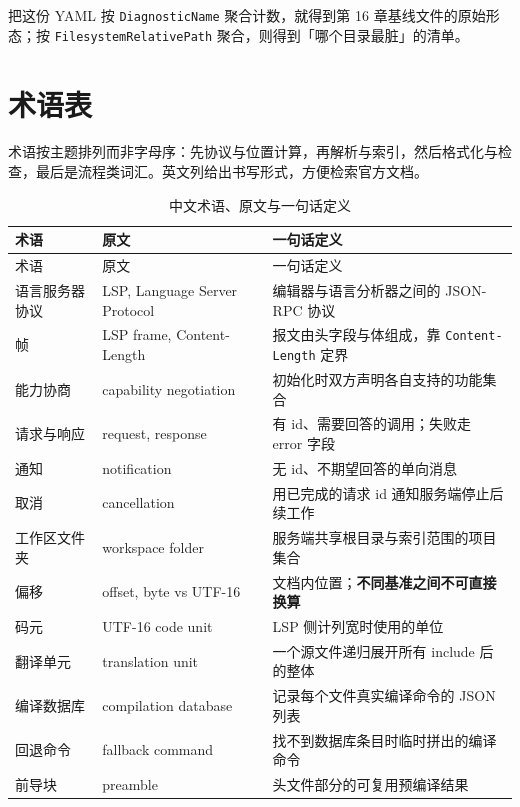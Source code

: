 \documentclass[12pt,a4paper,fontset=fandol]{ctexbook}
\begin{document}
把这份 YAML 按 \texttt{DiagnosticName} 聚合计数，就得到第 16 章基线文件的原始形态；按 \texttt{FilesystemRelativePath} 聚合，则得到「哪个目录最脏」的清单。

\chapter{术语表}\label{ch:appC}

术语按主题排列而非字母序：先协议与位置计算，再解析与索引，然后格式化与检查，最后是流程类词汇。英文列给出书写形式，方便检索官方文档。

{\footnotesize
\begin{longtable}{@{}>{\raggedright\arraybackslash}p{}
                  >{\raggedright\arraybackslash}p{}
                  >{\raggedright\arraybackslash}p{}@{}}
\caption{中文术语、原文与一句话定义}\label{tab:appC-gloss}\\
\toprule
术语 & 原文 & 一句话定义 \\
\midrule
\endfirsthead
\toprule
术语 & 原文 & 一句话定义 \\
\midrule
\endhead
\bottomrule
\endlastfoot
语言服务器协议 & LSP, Language Server Protocol & 编辑器与语言分析器之间的 JSON-RPC 协议 \\
帧 & LSP frame, Content-Length & 报文由头字段与体组成，靠 \texttt{Content-Length} 定界 \\
能力协商 & capability negotiation & 初始化时双方声明各自支持的功能集合 \\
请求与响应 & request, response & 有 id、需要回答的调用；失败走 error 字段 \\
通知 & notification & 无 id、不期望回答的单向消息 \\
取消 & cancellation & 用已完成的请求 id 通知服务端停止后续工作 \\
工作区文件夹 & workspace folder & 服务端共享根目录与索引范围的项目集合 \\
偏移 & offset, byte vs UTF-16 & 文档内位置；\textbf{不同基准之间不可直接换算} \\
码元 & UTF-16 code unit & LSP 侧计列宽时使用的单位 \\
翻译单元 & translation unit & 一个源文件递归展开所有 include 后的整体 \\
编译数据库 & compilation database & 记录每个文件真实编译命令的 JSON 列表 \\
回退命令 & fallback command & 找不到数据库条目时临时拼出的编译命令 \\
前导块 & preamble & 头文件部分的可复用预编译结果 \\

\end{longtable}}
\end{document}
